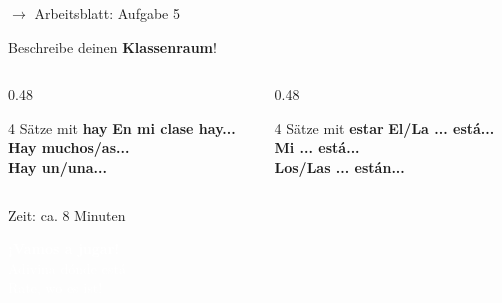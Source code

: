 \documentclass[aspectratio=169, 11pt]{beamer}
\newcommand{\es}[1]{\textbf{\textcolor{spanischrot}{#1}}}
\newcommand{\estar}[1]{\textbf{\textcolor{blau}{#1}}}
\begin{document}
\begin{frame}{$\rightarrow$ Arbeitsblatt: Aufgabe 5}

\begin{center}
{\Large Beschreibe deinen \textbf{Klassenraum}!}
\end{center}

\vspace{0.5cm}

\begin{columns}[T]
\begin{column}{0.48\textwidth}
\begin{block}{4 Sätze mit \es{hay}}
\es{En mi clase hay...}\\
\es{Hay muchos/as...}\\
\es{Hay un/una...}
\end{block}
\end{column}

\begin{column}{0.48\textwidth}
\begin{block}{4 Sätze mit \estar{estar}}
\estar{El/La ... está...}\\
\estar{Mi ... está...}\\
\estar{Los/Las ... están...}
\end{block}
\end{column}
\end{columns}

\vspace{0.5cm}

\begin{center}
{\small\textcolor{dunkelgrau}{Zeit: ca. 8 Minuten}}
\end{center}

\end{frame}

\begin{frame}
\begin{center}
\vspace{1.5cm}
{\Huge\bfseries\textcolor{white}{¡Vamos a jugar!}}\\[1cm]
{\Large\textcolor{white}{Adivina dónde está}}\\[0.5cm]
{\large\textcolor{white}{Rate, wo es ist!}}
\end{center}
\end{frame}
\end{document}
